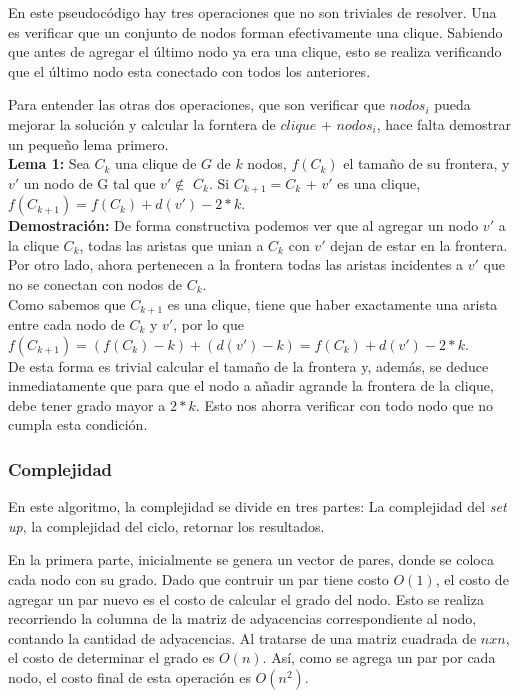 En este pseudocódigo hay tres operaciones que no son triviales de resolver. Una es verificar que un conjunto de nodos forman efectivamente una clique. Sabiendo que antes de agregar el último nodo ya era una clique, esto se realiza verificando que el último nodo esta conectado con todos los anteriores.

Para entender las otras dos operaciones, que son verificar que $nodos_i$ pueda mejorar la solución y calcular la forntera de $clique$ + $nodos_i$, hace falta demostrar un pequeño lema primero.\\

\textbf{Lema 1:} Sea $C_k$ una clique de $G$ de $k$ nodos, $f(C_k)$ el tamaño de su frontera, y $v'$ un nodo de G tal que $v' \not \in$ $C_k$. Si $C_{k+1} = C_k$ + $v'$ es una clique, $f(C_{k+1}) = f(C_k) + d(v') - 2*k$. \\

\textbf{Demostración:} De forma constructiva podemos ver que al agregar un nodo $v'$ a la clique $C_k$, todas las aristas que unian a $C_k$ con $v'$ dejan de estar en la frontera. Por otro lado, ahora pertenecen a la frontera todas las aristas incidentes a $v'$ que no se conectan con nodos de $C_k$.\\
Como sabemos que $C_{k+1}$ es una clique, tiene que haber exactamente una arista entre cada nodo de $C_k$ y $v'$, por lo que  $f(C_{k+1}) = (f(C_k) - k) + (d(v') - k) = f(C_k) + d(v') - 2*k$.\\


De esta forma es trivial calcular el tamaño de la frontera y, además, se deduce inmediatamente que para que el nodo a añadir agrande la frontera de la clique, debe tener grado mayor a $2*k$. Esto nos ahorra verificar con todo nodo que no cumpla esta condición.

\subsubsection{Complejidad}

En este algoritmo, la complejidad se divide en tres partes: La complejidad del \textit{set up}, la complejidad del ciclo, retornar los resultados.

En la primera parte, inicialmente se genera un vector de pares, donde se coloca cada nodo con su grado. Dado que contruir un par tiene costo $O(1)$, el costo de agregar un par nuevo es el costo de calcular el grado del nodo. Esto se realiza recorriendo la columna de la matriz de adyacencias correspondiente al nodo, contando la cantidad de adyacencias. Al tratarse de una matriz cuadrada de $n x n$, el costo de determinar el grado es $O(n)$. As\'i, como se agrega un par por cada nodo, el costo final de esta operaci\'on es $O(n^2)$.

